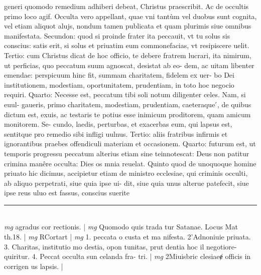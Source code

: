 \documentclass{article}
\begin{document}
\begin{pages}
generi quomodo remedium adhiberi debeat, Christus praescribit. Ac de occultis primo loco agif. Occulta vero appellant, quae vni tantùm vel duobus  sunt cognita, vel etiam aliquot alujs, nondum tamen publicata et quam plurimis siue omnibus  manifestata. Secundon: quod si proinde frater ita peccauit, vt tu solus sis conscius: satis erit, si solus et priuatim eum commonefacias, vt resipiscere uelit. Tertio: cum Christus dicat de hoc officio, te debere fratrem lucrari, ita nimirum, ut perficias, quo peccatum suum agnoscat, desistat ab eo- dem, ac uitam libenter emendae: perspicuum hinc fit, summam charitatem, fidelem ex uer- bo Dei institutionem, modestiam, oportunitatem, prudentiam, in toto hoc negocio requiri. Quarto: Necesse est, peccatum tibi soli notum diligenter celes. Nam, si euul- gaueris, primo charitatem, modestiam, prudentiam, caeteraque ́, de quibus dictum est, exuis, ac testaris te potius esse inimicum proditorem, quam amicum monitorem. Se- cundo, laedis, perturbas, et exacerbas eum, qui lapsus est, sentitque pro remedio sibi infligi uulnus. Tertio: aliis fratribus infirmis et ignorantibus praebes offendiculi materiam et occasionem. Quarto: futurum est, ut temporis progressu peccatum alterius etiam sine teinnotescat: Deus non patitur crimina manêre occulta: Dies os mnia reuelat. Quinto quod de unoquoque homine priuato hic dicimus, accipietur etiam de ministro ecclesiae, qui criminis occulti, ab aliquo perpetrati, siue quia ipse ui- dit, siue quia unus alterue patefecit, siue ipse reus uluo est fassus, conscius suerite  \pend
\vspace{0.5cm}\noindent
\vspace{0.2cm}\rule{1cm}{0.2pt}\\ 
\hspace{0.2cm}\textit{mg}
\footnotesize agradus cor rectionis. 
\normalsize| 
\hspace{0.2cm}\textit{mg}
\footnotesize Quomodo quis trada tur Satanae. Locus Mat th.18. 
\normalsize| 
\hspace{0.2cm}\textit{mg}
\footnotesize RCortart 
\normalsize| 
\hspace{0.2cm}\textit{mg}
\footnotesize 1. peccata o custa et ma nifesta. 2'Adnoniuie priuata. 3. Charitas, institutio mo destia, opon tunitas, prut dentia hoc il negotiore- quiritur. 4. Peccat occulta sun celanda fra- tri. 
\normalsize| 
\hspace{0.2cm}\textit{mg}
\footnotesize 2Miuisbric clesiaeɇ officis in corrigen us lapsis. 
\normalsize| 

\end{pages}
\end{document}
